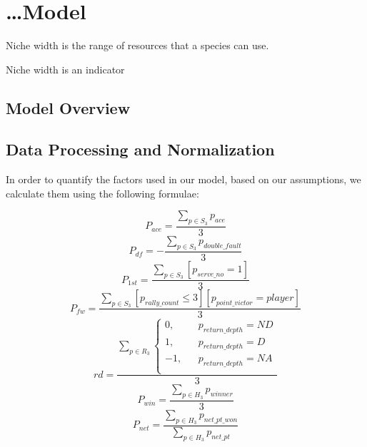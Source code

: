 \section{\ldots Model}
\begin{definition}
    Niche width is the range of resources that a species can use.
\end{definition}
Niche width is an indicator \cite{Alice13}

\subsection{Model Overview}

\subsection{Data Processing and Normalization}
In order to quantify the factors used in our model, based on our assumptions, we calculate them using the following formulae: \par
\begin{equation}
    P_{ace} = \frac{\sum_{p \in S_3} p_{ace}}{3}
\end{equation}
\begin{equation}
    P_{df} = -\frac{\sum_{p \in S_3} p_{double\_fault}}{3}
\end{equation}
\begin{equation}
    P_{1st} = \frac{\sum_{p \in S_3} [p_{serve\_no} = 1]}{3}
\end{equation}
\begin{equation}
    P_{fw} = \frac{\sum_{p \in S_3} [p_{rally\_count} \le 3] [p_{point\_victor} = player]}{3}
\end{equation}
\begin{equation}
    rd = \frac{\sum_{p \in R_3} \left\{
        \begin{aligned}
        0, && p_{return\_depth} = ND \\
        1, && p_{return\_depth} = D \\
        -1, && p_{return\_depth} = NA \\
        \end{aligned}
        \right.}{3}
\end{equation}
\begin{equation}
    P_{win} = \frac{\sum_{p \in H_3} p_{winner}}{3}
\end{equation}
\begin{equation}
    P_{net} = \frac{\sum_{p \in H_3} p_{net\_pt\_won}}{\sum_{p \in H_3} p_{net\_pt}}
\end{equation}
